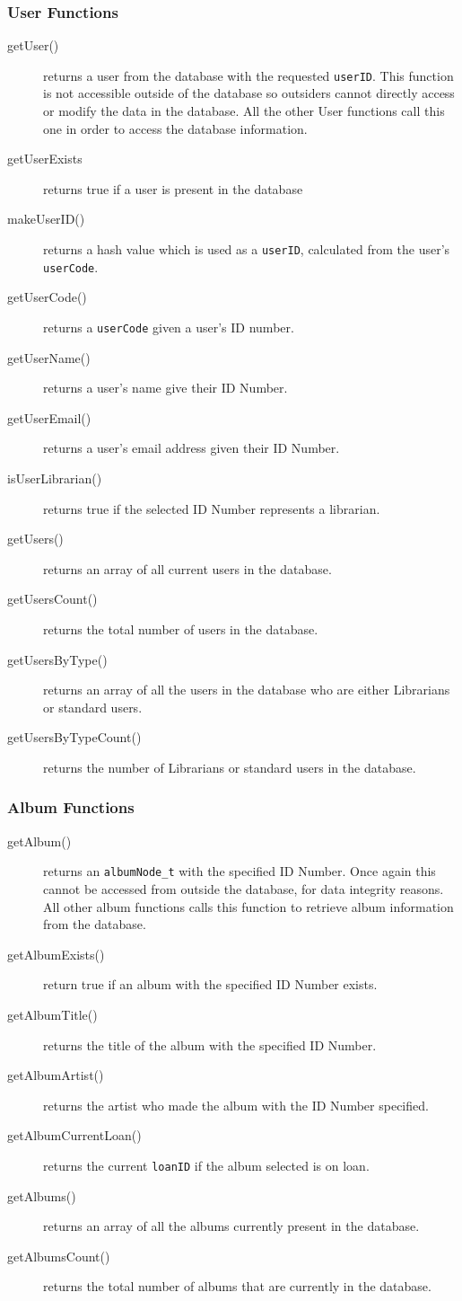 \documentclass{article}
\begin{document}
\subsubsection{User Functions}
\begin{description}
\item[getUser()] returns a user from the database with the requested \verb|userID|. This function is not accessible outside of the database so outsiders cannot directly access or modify the data in the database. All the other User functions call this one in order to access the database information.
\item[getUserExists] returns true if a user is present in the database
\item[makeUserID()] returns a hash value which is used as a \verb|userID|, calculated from the user's \verb|userCode|.
\item[getUserCode()] returns a \verb|userCode| given a user's ID number.
\item[getUserName()] returns a user's name give their ID Number.
\item[getUserEmail()] returns a user's email address given their ID Number.
\item[isUserLibrarian()] returns true if the selected ID Number represents a librarian.
\item[getUsers()] returns an array of all current users in the database.
\item[getUsersCount()] returns the total number of users in the database.
\item[getUsersByType()] returns an array of all the users in the database who are either Librarians or standard users.
\item[getUsersByTypeCount()] returns the number of Librarians or standard users in the database.
\end{description}

\subsubsection{Album Functions}
\begin{description}
\item[getAlbum()] returns an \verb|albumNode_t| with the specified ID Number. Once again this cannot be accessed from outside the database, for data integrity reasons. All other album functions calls this function to retrieve album information from the database.
\item[getAlbumExists()] return true if an album with the specified ID Number exists.
\item[getAlbumTitle()] returns the title of the album with the specified ID Number.
\item[getAlbumArtist()] returns the artist who made the album with the ID Number specified.
\item[getAlbumCurrentLoan()] returns the current \verb|loanID| if the album selected is on loan.
\item[getAlbums()] returns an array of all the albums currently present in the database.
\item[getAlbumsCount()] returns the total number of albums that are currently in the database.
\end{description}
\end{document}
